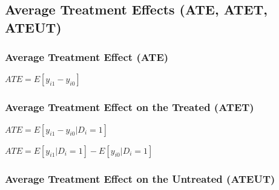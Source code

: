 
\subsection{Average Treatment Effects (ATE, ATET, ATEUT)}

\subsubsection{Average Treatment Effect (ATE)}

\(ATE=E[y_{i1}-y_{i0}]\)

\subsubsection{Average Treatment Effect on the Treated (ATET)}

\(ATE=E[y_{i1}-y_{i0}|D_i=1]\)

\(ATE=E[y_{i1}|D_i=1]-E[y_{i0}|D_i=1]\)

\subsubsection{Average Treatment Effect on the Untreated (ATEUT)}


